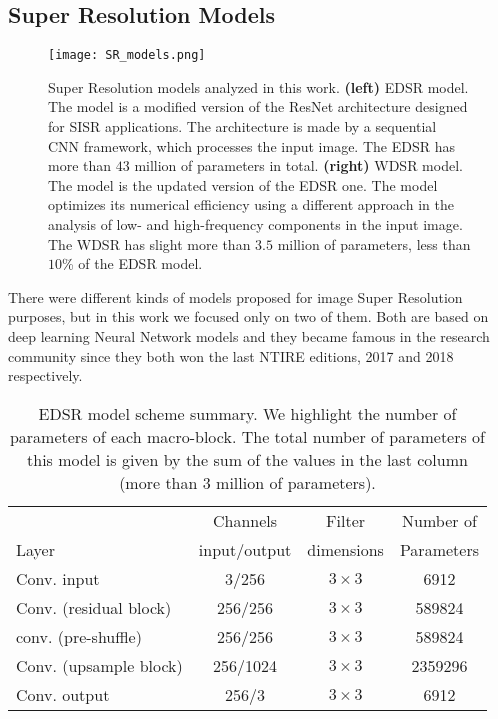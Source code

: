 \documentclass{standalone}
\begin{document}
\subsection[Super Resolution Models]{Super Resolution Models}\label{SR:wdsr}

\begin{center}
\begin{figure}[htbp]
\centering
\texttt{[image: SR\_models.png]}
\caption{Super Resolution models analyzed in this work.
\textbf{(left)} EDSR model.
The model is a modified version of the ResNet architecture designed for SISR applications.
The architecture is made by a sequential CNN framework, which processes the input image.
The EDSR has more than $43$ million of parameters in total.
\textbf{(right)} WDSR model.
The model is the updated version of the EDSR one.
The model optimizes its numerical efficiency using a different approach in the analysis of low- and high-frequency components in the input image.
The WDSR has slight more than $3.5$ million of parameters, less than $10$\% of the EDSR model.
}
\label{fig:sr_models}
\end{figure}
\end{center}

There were different kinds of models proposed for image Super Resolution purposes, but in this work we focused only on two of them.
Both are based on deep learning Neural Network models and they became famous in the research community since they both won the last NTIRE editions, 2017 and 2018 respectively.

\begin{table}[htbp]
\centering
\begin{tabular}{lccc}
\hline \rowcolor{darkgrayrow}
                         &  Channels     & Filter     & Number of    \\
\rowcolor{darkgrayrow}
Layer                    & input/output  & dimensions & Parameters   \\
\hline
Conv. input              & 3/256      & $3\times3$   & 6912    \\
Conv. (residual block)   & 256/256    & $3\times3$   & 589824  \\
conv. (pre-shuffle)      & 256/256    & $3\times3$   & 589824  \\
Conv. (upsample block)   & 256/1024   & $3\times3$   & 2359296 \\
Conv. output             & 256/3      & $3\times3$   & 6912    \\
\hline
\end{tabular}
\caption{EDSR model scheme summary.
We highlight the number of parameters of each macro-block.
The total number of parameters of this model is given by the sum of the values in the last column (more than 3 million of parameters).
}
\label{tab:edsr}
\end{table}
\end{document}
